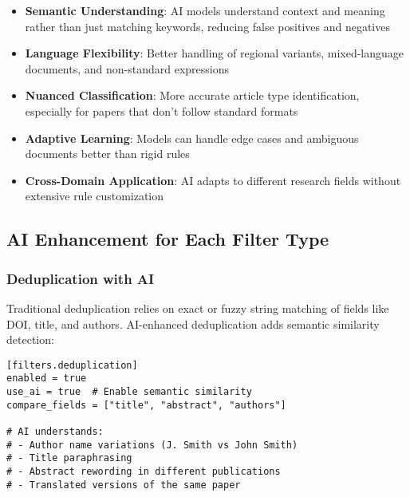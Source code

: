 
\begin{itemize}
    \item \textbf{Semantic Understanding}: AI models understand context and meaning rather than just matching keywords, reducing false positives and negatives
    \item \textbf{Language Flexibility}: Better handling of regional variants, mixed-language documents, and non-standard expressions
    \item \textbf{Nuanced Classification}: More accurate article type identification, especially for papers that don't follow standard formats
    \item \textbf{Adaptive Learning}: Models can handle edge cases and ambiguous documents better than rigid rules
    \item \textbf{Cross-Domain Application}: AI adapts to different research fields without extensive rule customization
\end{itemize}

\subsection{AI Enhancement for Each Filter Type}

\subsubsection{Deduplication with AI}

Traditional deduplication relies on exact or fuzzy string matching of fields like DOI, title, and authors. AI-enhanced deduplication adds semantic similarity detection:

\begin{configbox}
\begin{lstlisting}
[filters.deduplication]
enabled = true
use_ai = true  # Enable semantic similarity
compare_fields = ["title", "abstract", "authors"]

# AI understands:
# - Author name variations (J. Smith vs John Smith)
# - Title paraphrasing
# - Abstract rewording in different publications
# - Translated versions of the same paper
\end{lstlisting}
\end{configbox}

